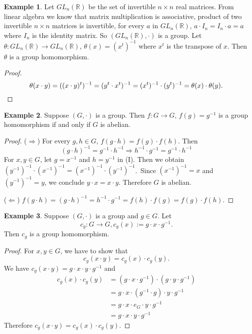\documentclass{article}
\theoremstyle{plain}
\theoremstyle{definition}
\newtheorem*{example}{Example}
\newcommand{\FR}{\mathbb{R}}
\begin{document}
\begin{example}
    Let $GL_n(\FR)$ be the set of invertible $n\times n$
    real matrices. From linear algebra we know that matrix
    multiplication is associative, product of two
    invertible $n\times n$ matrices is invertible, for
    every $a$ in $GL_n(\FR)$, $a\cdot I_n=I_n\cdot a=a$
    where $I_n$ is the identity matrix.
    So $(GL_n(\FR),\cdot)$ is a group. Let $\theta:GL_n(\FR)\to GL_n(\FR)$,
    $\theta(x)=(x^t)^{-1}$ where $x^t$ is the transpose of $x$. Then
    $\theta$ is a group homomorphism.
\end{example}

\begin{proof}
    \[\theta(x\cdot y)=((x\cdot y)^t)^{-1}=(y^t\cdot x^t)^{-1}=(x^t)^{-1}\cdot(y^t)^{-1}=\theta(x)\cdot\theta(y).\qedhere\]
\end{proof}

\begin{example}
    Suppose $(G,\cdot)$ is a group. Then $f:G\to G$, $f(g)=g^{-1}$
    is a group homomorphism if and only if $G$ is abelian.
\end{example}

\begin{proof}
    ($\Rightarrow$) For every $g,h\in G$, $f(g\cdot h)=f(g)\cdot f(h)$.
    Then 
    \begin{equation}
        (g\cdot h)^{-1}=g^{-1}\cdot h^{-1}\Rightarrow h^{-1}\cdot g^{-1}=g^{-1}\cdot h^{-1}\tag{(I)}
    \end{equation}
    For $x,y\in G$, let $g=x^{-1}$ and $h=y^{-1}$ in (I). Then
    we obtain $(y^{-1})^{-1}\cdot (x^{-1})^{-1}=(x^{-1})^{-1}\cdot(y^{-1})^{-1}$.\
    Since $(x^{-1})^{-1}=x$ and $(y^{-1})^{-1}=y$, we conclude
    $y\cdot x=x\cdot y$. Therefore $G$ is abelian.

    ($\Leftarrow$) $f(g\cdot h)=(g\cdot h)^{-1}=h^{-1}\cdot g^{-1}=f(h)\cdot f(g)=f(g)\cdot f(h)$.
\end{proof}

\begin{example}
    Suppose $(G,\cdot)$ is a group and $g\in G$. Let
    \[c_g:G\to G,c_g(x):=g\cdot x\cdot g^{-1}.\]
    Then $c_g$ is a group homomorphism.
\end{example}

\begin{proof}
    For $x,y\in G$, we have to show that 
    \[c_g(x\cdot y)=c_g(x)\cdot c_g(y).\]
    We have $c_g(x\cdot y)=g\cdot x\cdot y\cdot g^{-1}$ and 
    \[\begin{split}
        c_g(x)\cdot c_g(y)
        &=(g\cdot x\cdot g^{-1})\cdot(g\cdot y\cdot g^{-1})\\
        &=g\cdot x\cdot (g^{-1}\cdot g)\cdot y\cdot g^{-1}\\
        &=g\cdot x\cdot e_G\cdot y\cdot g^{-1}\\
        &=g\cdot x\cdot y\cdot g^{-1}
    \end{split}\]
    Therefore $c_g(x\cdot y)=c_g(x)\cdot c_g(y)$.
\end{proof}
\end{document}
